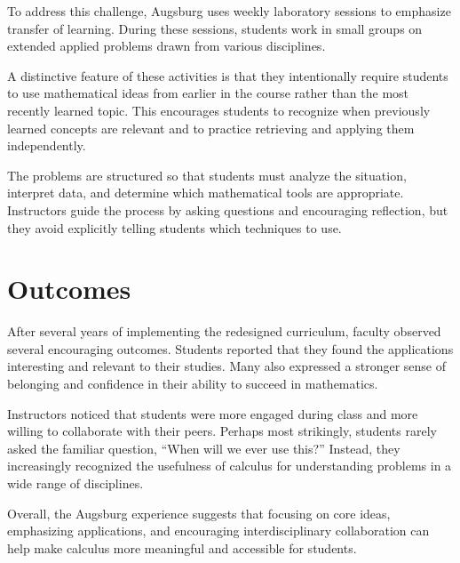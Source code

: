 \documentclass[11pt]{article}
\begin{document}
To address this challenge, Augsburg uses weekly laboratory sessions to emphasize transfer of learning. During these sessions, students work in small groups on extended applied problems drawn from various disciplines.

A distinctive feature of these activities is that they intentionally require students to use mathematical ideas from earlier in the course rather than the most recently learned topic. This encourages students to recognize when previously learned concepts are relevant and to practice retrieving and applying them independently.

The problems are structured so that students must analyze the situation, interpret data, and determine which mathematical tools are appropriate. Instructors guide the process by asking questions and encouraging reflection, but they avoid explicitly telling students which techniques to use.

\section*{Outcomes}

After several years of implementing the redesigned curriculum, faculty observed several encouraging outcomes. Students reported that they found the applications interesting and relevant to their studies. Many also expressed a stronger sense of belonging and confidence in their ability to succeed in mathematics.

Instructors noticed that students were more engaged during class and more willing to collaborate with their peers. Perhaps most strikingly, students rarely asked the familiar question, “When will we ever use this?” Instead, they increasingly recognized the usefulness of calculus for understanding problems in a wide range of disciplines.

Overall, the Augsburg experience suggests that focusing on core ideas, emphasizing applications, and encouraging interdisciplinary collaboration can help make calculus more meaningful and accessible for students.
\end{document}
